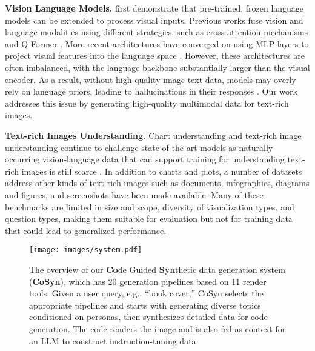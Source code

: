 \textbf{Vision Language Models.} \citet{tsimpoukelli2021multimodal} first demonstrate that pre-trained, frozen language models can be extended to process visual inputs.
Previous works fuse vision and language modalities using different strategies, such as cross-attention mechanisms \citep{alayrac2022flamingo} and Q-Former \citep{li2023blip}. 
More recent architectures have converged on using MLP layers to project visual features into the language space \citep{liu2023llava}.
However, these architectures are often imbalanced, with the language backbone substantially larger than the visual encoder. 
As a result, without high-quality image-text data, models may overly rely on language priors, leading to hallucinations in their responses \citep{bai2024hallucination}.
Our work addresses this issue by generating high-quality multimodal data for text-rich images.

\smallbreak
\noindent \textbf{Text-rich Images Understanding.} Chart understanding and text-rich image understanding continue to challenge state-of-the-art models as naturally occurring vision-language data that can support training for understanding text-rich images is still scarce \citep{kahou2017figureqa,kafle2018dvqa,xu2023chartbench,mukhopadhyay-etal-2024-unraveling}. In addition to charts and plots, a number of datasets address other kinds of text-rich images such as documents, infographics, diagrams and figures, and screenshots \citep{figureseer,mathew2021docvqa,mathew2022infographicvqa,baechler2024screenai,roberts2024scifibench} have been made available. Many of these benchmarks are limited in size and scope, diversity of visualization types, and question types, making them suitable for evaluation but not for training data that could lead to generalized performance.

\begin{figure*}[!t]
    \centering
    \texttt{[image: images/system.pdf]}
    \vspace{-.7cm}
    \caption{The overview of our \textbf{Co}de Guided \textbf{Syn}thetic data generation system (\textbf{CoSyn}), which has 20 generation pipelines based on 11 render tools. Given a user query, e.g., ``book cover,'' CoSyn selects the appropriate pipelines and starts with generating diverse topics conditioned on personas, then synthesizes detailed data for code generation. The code renders the image and is also fed as context for an LLM to construct instruction-tuning data.}
    \label{fig: system}
    \vspace{-0.3cm}
\end{figure*}

